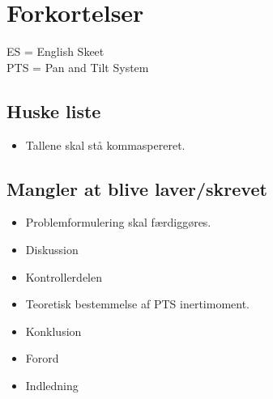 \section*{Forkortelser}

ES = English Skeet \\
PTS = Pan and Tilt System

\subsection*{Huske liste}
\begin{itemize}
\item Tallene skal stå kommaspereret.
\end{itemize}



\subsection*{Mangler at blive laver/skrevet}
\begin{itemize}
\item Problemformulering skal færdiggøres. 
\item Diskussion
\item Kontrollerdelen
\item Teoretisk bestemmelse af PTS inertimoment. 
\item Konklusion
\item Forord
\item Indledning

\listoftodos

\end{itemize}